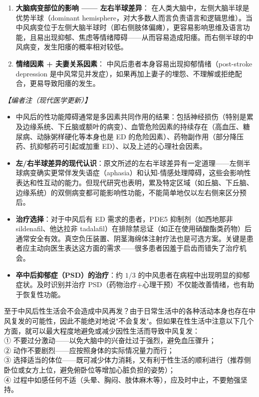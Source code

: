 \begin{enumerate}
\begin{enumerate}
	\item \textbf{大脑病变部位的影响 —— 左右半球差异}：
	在人类大脑中，左侧大脑半球是优势半球（dominant hemisphere，对大多数人而言负责语言和逻辑思维）。当中风病变位于左侧大脑半球时（即右侧肢体偏瘫），更容易影响思维及语言功能，且易出现抑郁、焦虑等情绪障碍——从而容易造成阳痿。而右侧半球的中风病变，发生阳痿的概率相对较低。

	\item \textbf{情绪因素 + 夫妻关系因素}：
	中风后患者本身容易出现抑郁情绪（post-stroke depression 是中风常见并发症），如果再加上妻子的埋怨、不理解或拒绝配合，更易导致阳痿的发生。
\end{enumerate}

\noindent\textit{【编者注（现代医学更新）】}
\begin{itemize}
	\item 中风后的性功能障碍通常是多因素共同作用的结果：包括神经损伤（特别是累及边缘系统、下丘脑或额叶的病变）、血管危险因素的持续存在（高血压、糖尿病、动脉粥样硬化等本身也是 ED 的危险因素）、药物副作用（部分降压药、抗抑郁药可引起或加重 ED）、以及上述的心理社会因素。
	\item \textbf{左/右半球差异的现代认识}：原文所述的左右半球差异有一定道理——左侧半球病变确实更常伴发失语症（aphasia）和认知-情感处理障碍，这些会影响性表达和性互动的能力。但现代研究也表明，累及特定区域（如丘脑、下丘脑、边缘系统）的双侧病变都可能影响性功能，不能简单地仅以左右侧来区分预后。
	\item \textbf{治疗选择}：对于中风后有 ED 需求的患者，PDE5 抑制剂（如西地那非 sildenafil、他达拉非 tadalafil）在排除禁忌证（如正在使用硝酸酯类药物）后通常安全有效。真空负压装置、阴茎海绵体注射疗法也是可选方案。关键是患者应主动向医生表达这方面的需求——很多患者因羞于启齿而错失了治疗机会。
	\item \textbf{卒中后抑郁症（PSD）的治疗}：约 $1/3$ 的中风患者在病程中出现明显的抑郁症状。及时识别并治疗 PSD（药物治疗+心理干预）不仅能改善情绪，也有助于恢复性功能。
\end{itemize}

\begin{tcolorbox}[colback=pink!5!white,colframe=red!50!black,title=贴心小叮咛]
至于中风后性生活会不会造成中风再发？由于日常生活中的各种活动本身也存在中风复发的可能性，因此不能绝对地说"不会复发"。但如果在性生活中注意以下几个方面，就可以最大程度地避免或减少因性生活而导致中风复发：\\
① 不要过分激动——以免大脑中的兴奋灶过于强烈，避免血压骤升；\\
② 动作不要剧烈——应按照身体的实际情况量力而行；\\
③ 选择适当的体位——既可减少体力消耗，又有利于性生活的顺利进行（推荐侧卧位或女方上位，避免俯卧位等增加心脏负担的姿势）；\\
④ 过程中如感任何不适（头晕、胸闷、肢体麻木等），应及时中止，不要勉强坚持。
\end{tcolorbox}


\end{enumerate}
